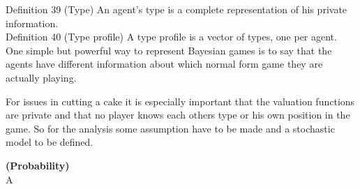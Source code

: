Definition 39 (Type) An agent's type is a complete representation of his private information.\\
Definition 40 (Type profile) A type profile is a vector of types, one per agent. One simple but powerful way to represent Bayesian games is to say that the agents have different information about which normal form game they are actually playing.

For issues in cutting a cake it is especially important that the valuation functions are private and that no player knows each others type or his own position in the game. So for the analysis some assumption have to be made and a stochastic model to be defined.
\begin{defi}{\textbf{(Probability)}}\\
A 
\end{defi}
